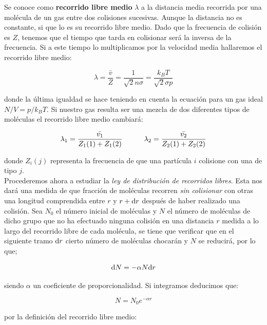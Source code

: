\documentclass[12pt,a4paper,oneside]{book}
\begin{document}
Se conoce como \textbf{recorrido libre medio} $\lambda$ a la distancia media recorrida por una molécula de un gas entre dos colisiones sucesivas. Aunque la distancia no es constante, si que lo es su recorrido libre medio. Dado que la frecuencia de colisión es $Z$, tenemos que el tiempo que tarda en colisionar será la inversa de la frecuencia. Si a este tiempo lo multiplicamos por la velocidad media hallaremos el recorrido libre medio:

\begin{equation}
\lambda = \frac{\bar{v}}{Z} =  \frac{1}{\sqrt{2} n \sigma} = \frac{k_B T}{\sqrt{2} \sigma p}
\end{equation}

donde la última igualdad se hace teniendo en cuenta la ecuación para un gas ideal $N/V = p/k_BT$. Si nuestro gas resulta ser una mezcla de dos diferentes tipos de moléculas el recorrido libre medio cambiará: 

\begin{equation}
\lambda_1 = \dfrac{\bar{v_1}}{Z_1(1) + Z_1(2)} \quad \quad \quad 
\lambda_2 = \dfrac{\bar{v_2}}{Z_2(1) + Z_2(2)}
\end{equation}

donde $Z_i(j)$ representa la frecuencia de que una partícula $i$ colisione con una de tipo $j$. \\

Procederemos ahora a estudiar la \textit{ley de distribución de recorridos libres}. Esta nos dará una medida de que fracción de moléculas recorren \textit{sin colisionar} con otras una longitud comprendida entre $r$ y $r + \mathrm{d} r$ después de haber realizado una colisión. Sea $N_0$ el número inicial de moléculas y $N$ el número de moléculas de dicho grupo que no ha efectuado ninguna colisión en una distancia $r$ medida a lo largo del recorrido libre de cada molécula, se tiene que verificar que en el siguiente tramo $\mathrm{d} r$ cierto número de moléculas chocarán y $N$ se reducirá, por lo que;

\begin{equation}
\mathrm{d} N = - \alpha N \mathrm{d} r
\end{equation}

siendo $\alpha$ un coeficiente de proporcionalidad. Si integramos deducimos que:

\begin{equation}
N = N_0 e^{-\alpha r}
\end{equation}

por la definición del recorrido libre medio:
\end{document}
